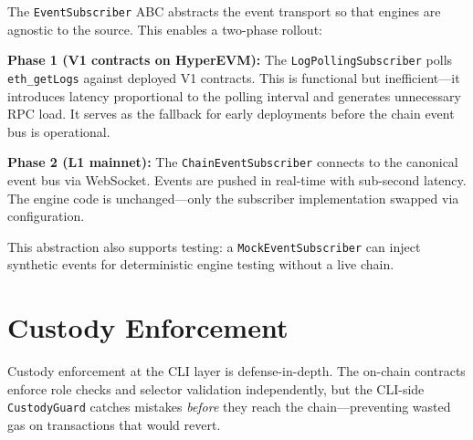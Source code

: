 \documentclass[11pt,a4paper]{article}
\begin{document}
\begin{designbox}
The \texttt{EventSubscriber} ABC abstracts the event transport so that engines are
agnostic to the source. This enables a two-phase rollout:

\textbf{Phase 1 (V1 contracts on HyperEVM):} The \texttt{LogPollingSubscriber}
polls \texttt{eth\_getLogs} against deployed V1 contracts. This is functional but
inefficient---it introduces latency proportional to the polling interval and
generates unnecessary RPC load. It serves as the fallback for early deployments
before the chain event bus is operational.

\textbf{Phase 2 (L1 mainnet):} The \texttt{ChainEventSubscriber} connects to
the canonical event bus via WebSocket. Events are pushed in real-time with sub-second
latency. The engine code is unchanged---only the subscriber implementation swapped
via configuration.

This abstraction also supports testing: a \texttt{MockEventSubscriber} can inject
synthetic events for deterministic engine testing without a live chain.
\end{designbox}

\section{Custody Enforcement}

Custody enforcement at the CLI layer is defense-in-depth. The on-chain contracts
enforce role checks and selector validation independently, but the CLI-side
\texttt{CustodyGuard} catches mistakes \emph{before} they reach the chain---preventing
wasted gas on transactions that would revert.
\end{document}
